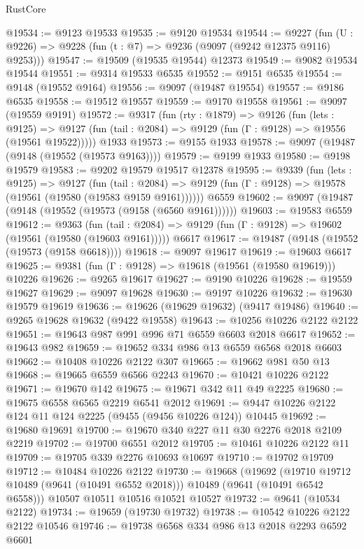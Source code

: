 \begin{lexlean}{RustCore}
\begin{coremodule}
@19534 := @9123 @19533
@19535 := @9120 @19534
@19544 := @9227
    (fun (U : @9226) => @9228 (fun (t : @7) => @9236 (@9097 (@9242 @12375 @9116) @9253)))
@19547 := @19509 (@19535 @19544) @12373
@19549 := @9082 @19534 @19544
@19551 := @9314 @19533 @6535
@19552 := @9151 @6535
@19554 := @9148 (@19552 @9164)
@19556 := @9097 (@19487 @19554)
@19557 := @9186 @6535
@19558 := @19512 @19557
@19559 := @9170 @19558
@19561 := @9097 (@19559 @9191)
@19572 := @9317
    (fun (rty : @1879) =>
    @9126
      (fun (lets : @9125) =>
      @9127 (fun (tail : @2084) => @9129 (fun (Γ : @9128) => @19556 (@19561 @19522)))))
    @1933
@19573 := @9155 @1933
@19578 := @9097 (@19487 (@9148 (@19552 (@19573 @9163))))
@19579 := @9199 @1933
@19580 := @9198 @19579
@19583 := @9202 @19579 @19517 @12378
@19595 := @9339
    (fun (lets : @9125) =>
    @9127
      (fun (tail : @2084) =>
      @9129 (fun (Γ : @9128) => @19578 (@19561 (@19580 (@19583 @9159 @9161))))))
    @6559
@19602 := @9097 (@19487 (@9148 (@19552 (@19573 (@9158 (@6560 @9161))))))
@19603 := @19583 @6559
@19612 := @9363
    (fun (tail : @2084) => @9129 (fun (Γ : @9128) => @19602 (@19561 (@19580 (@19603 @9161)))))
    @6617
@19617 := @19487 (@9148 (@19552 (@19573 (@9158 @6618))))
@19618 := @9097 @19617
@19619 := @19603 @6617
@19625 := @9381 (fun (Γ : @9128) => @19618 (@19561 (@19580 @19619))) @10226
@19626 := @9265 @19617
@19627 := @9190 @10226
@19628 := @19559 @19627
@19629 := @9097 @19628
@19630 := @9197 @10226
@19632 := @19630 @19579 @19619
@19636 := @19626 (@19629 @19632) (@9417 @19486)
@19640 := @9265 @19628 @19632 (@9422 @19558)
@19643 := @10256 @10226 @2122 @2122
@19651 := @19643 @987 @991 @996 @71 @6559 @6603 @2018 @6617
@19652 := @19643 @982
@19659 := @19652 @334 @986 @13 @6559 @6568 @2018 @6603
@19662 := @10408 @10226 @2122 @307
@19665 := @19662 @981 @50 @13
@19668 := @19665 @6559 @6566 @2243
@19670 := @10421 @10226 @2122
@19671 := @19670 @142
@19675 := @19671 @342 @11 @49 @2225
@19680 := @19675 @6558 @6565 @2219 @6541 @2012
@19691 := @9447 @10226 @2122 @124 @11 @124 @2225 (@9455 (@9456 @10226 @124)) @10445
@19692 := @19680 @19691
@19700 := @19670 @340 @227 @11 @30 @2276 @2018 @2109 @2219
@19702 := @19700 @6551 @2012
@19705 := @10461 @10226 @2122 @11
@19709 := @19705 @339 @2276 @10693 @10697
@19710 := @19702 @19709
@19712 := @10484 @10226 @2122
@19730 := @19668
    (@19692 (@19710 @19712 @10489 (@9641 (@10491 @6552 @2018))) @10489 (@9641 (@10491 @6542 @6558)))
    @10507
    @10511
    @10516
    @10521
    @10527
@19732 := @9641 (@10534 @2122)
@19734 := @19659 (@19730 @19732)
@19738 := @10542 @10226 @2122 @2122 @10546
@19746 := @19738 @6568 @334 @986 @13 @2018 @2293 @6592 @6601

\end{coremodule}
\end{lexlean}
